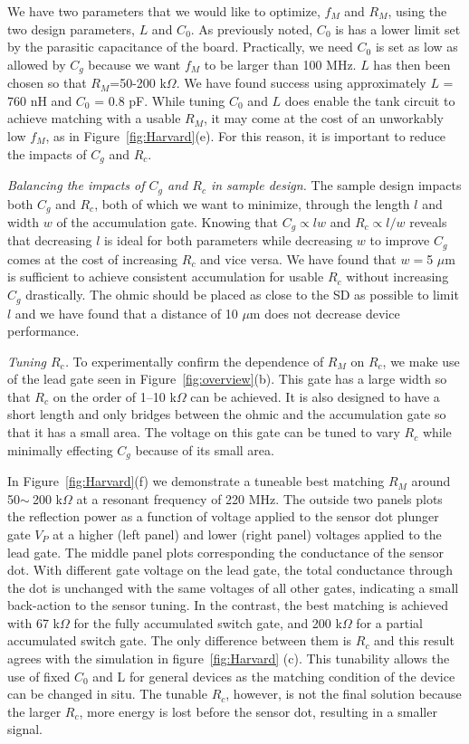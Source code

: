 \documentclass{article}
\begin{document}
	We have two parameters that we would like to optimize, $f_M$ and $R_M$, using the two design parameters, $L$ and $C_0$.  As previously noted, $C_0$ is has a lower limit set by the parasitic capacitance of the board.  Practically, we need $C_0$ is set as low as allowed by $C_g$ because we want $f_M$ to be larger than 100 MHz.  $L$ has then been chosen so that $R_M$=50-200 k$\Omega$.  We have found success using approximately $L$ = 760 nH and $C_0$ = 0.8 pF.  While tuning $C_0$ and $L$ does enable the tank circuit to achieve matching with a usable $R_M$, it may come at the cost of an unworkably low $f_M$, as in Figure\ \ref{fig:Harvard}(e).  For this reason, it is important to reduce the impacts of $C_g$ and $R_c$.

	\textit{Balancing the impacts of $C_g$ and $R_c$ in sample design.}  The sample design impacts both $C_g$ and $R_c$, both of which we want to minimize, through the length $l$ and width $w$ of the accumulation gate.  Knowing that $C_g\propto lw$ and $R_c\propto l/w$ reveals that decreasing $l$ is ideal for both parameters while decreasing $w$ to improve $C_g$ comes at the cost of increasing $R_c$ and vice versa.  We have found that $w=$5 $\mu$m is sufficient to achieve consistent accumulation for usable $R_c$ without increasing $C_g$ drastically.  The ohmic should be placed as close to the SD as possible to limit $l$ and we have found that a distance of 10 $\mu$m does not decrease device performance.  

	\textit{Tuning $R_c$.}  To experimentally confirm the dependence of $R_M$ on $R_c$, we make use of the lead gate seen in Figure\ \ref{fig:overview}(b).  This gate has a large width so that $R_c$ on the order of 1--10 k$\Omega$ can be achieved.  It is also designed to have a short length and only bridges between the ohmic and the accumulation gate so that it has a small area.  The voltage on this gate can be tuned to vary $R_c$ while minimally effecting $C_g$ because of its small area.  

	In Figure\ \ref{fig:Harvard}(f) we demonstrate a tuneable best matching $R_M$ around 50$\sim~$200 k$\Omega$ at a resonant frequency of 220 MHz. The outside two panels plots the reflection power as a function of voltage applied to the sensor dot plunger gate $V_{P}$ at a higher (left panel) and lower (right panel) voltages applied to the lead gate. The middle panel plots corresponding the conductance of the sensor dot. With different gate voltage on the lead gate, the total conductance through the dot is unchanged with the same voltages of all other gates, indicating a small back-action to the sensor tuning. In the contrast, the best matching is achieved with 67 k$\Omega$ for the fully accumulated switch gate, and 200 k$\Omega$ for a partial accumulated switch gate. The only difference between them is $R_c$ and this result agrees with the simulation in figure\ \ref{fig:Harvard} (c). This tunability allows the use of fixed $C_0$ and L for general devices as the matching condition of the device can be changed in situ.  The tunable $R_c$, however, is not the final solution because the larger $R_c$, more energy is lost before the sensor dot, resulting in a smaller signal.
\end{document}
